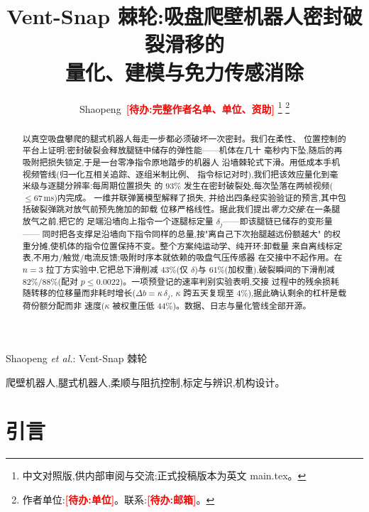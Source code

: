 \documentclass[journal]{IEEEtran}
\newcommand{\TODO}[1]{\textcolor{red}{\textbf{[待办:#1]}}}
\begin{document}
\title{Vent-Snap 棘轮:吸盘爬壁机器人密封破裂滑移的\\
量化、建模与免力传感消除}

\author{Shaopeng~\TODO{完整作者名单、单位、资助}%
\thanks{中文对照版,供内部审阅与交流;正式投稿版本为英文 main.tex。}%
\thanks{作者单位:\TODO{单位}。联系:\TODO{邮箱}。}}

%
{Shaopeng \MakeLowercase{\textit{et al.}}: Vent-Snap 棘轮}

\maketitle

\begin{abstract}
以真空吸盘攀爬的腿式机器人每走一步都必须破坏一次密封。我们在柔性、
位置控制的平台上证明:密封破裂会释放腿链中储存的弹性能——机体在几十
毫秒内下坠,随后的再吸附把损失锁定,于是一台零净指令原地踏步的机器人
沿墙棘轮式下滑。用低成本手机视频管线(归一化互相关追踪、逐组米制比例、
指令标记对时),我们把该效应量化到毫米级与逐腿分辨率:每周期位置损失
的 $93\%$ 发生在密封破裂处,每次坠落在两帧视频($\le67$\,ms)内完成。
一维并联弹簧模型解释了损失,
并给出四条经实验验证的预言,其中包括破裂弹跳对放气前预先施加的卸载
位移严格线性。据此我们提出\emph{零力交接}:在一条腿放气之前,把它的
足端沿墙向上指令一个逐腿标定量 $\delta_j$——即该腿链已储存的变形量——
同时把各支撑足沿墙向下指令同样的总量,按"离自己下次抬腿越远份额越大"
的权重分摊,使机体的指令位置保持不变。整个方案纯运动学、纯开环:卸载量
来自离线标定表,不用力/触觉/电流反馈;吸附时序本就依赖的吸盘气压传感器
在交接中不起作用。在 $n{=}3$ 拉丁方实验中,它把总下滑削减
$43\%$(仅 $\delta$)与 $61\%$(加权重),破裂瞬间的下滑削减
$82\%$/$88\%$(配对 $p\le0.0022$)。一项预登记的速率判别实验表明,交接
过程中的残余损耗随转移的位移量而非耗时增长($\Delta b=\kappa\,\delta_j$,
$\kappa$ 跨五天复现至 $4\%$),据此确认剩余的杠杆是载荷份额分配而非
速度($\kappa$ 被权重压低 $44\%$)。数据、日志与量化管线全部开源。
\end{abstract}

\begin{IEEEkeywords}
爬壁机器人,腿式机器人,柔顺与阻抗控制,标定与辨识,机构设计。
\end{IEEEkeywords}

\section{引言}
\label{sec:intro}
\end{document}
